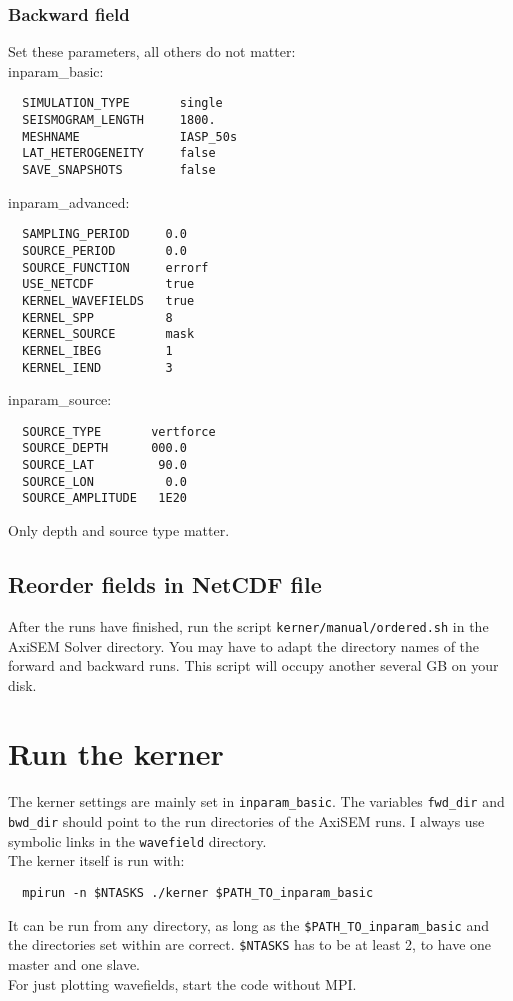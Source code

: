 \documentclass[a4wide]{scrartcl}
\begin{document}
 \subsubsection{Backward field}
 Set these parameters, all others do not matter:  \\
 inparam\_basic:
 \begin{verbatim}
  SIMULATION_TYPE   	single
  SEISMOGRAM_LENGTH  	1800.
  MESHNAME            	IASP_50s
  LAT_HETEROGENEITY   	false
  SAVE_SNAPSHOTS       	false
 \end{verbatim}
 inparam\_advanced:
 \begin{verbatim}
  SAMPLING_PERIOD     0.0
  SOURCE_PERIOD       0.0
  SOURCE_FUNCTION     errorf
  USE_NETCDF          true
  KERNEL_WAVEFIELDS   true
  KERNEL_SPP          8
  KERNEL_SOURCE       mask
  KERNEL_IBEG         1
  KERNEL_IEND         3
 \end{verbatim}
 inparam\_source:
 \begin{verbatim}
  SOURCE_TYPE       vertforce
  SOURCE_DEPTH      000.0
  SOURCE_LAT         90.0
  SOURCE_LON          0.0
  SOURCE_AMPLITUDE   1E20
 \end{verbatim}
 Only depth and source type matter. 
 \subsection{Reorder fields in NetCDF file}
 After the runs have finished, run the script \verb|kerner/manual/ordered.sh| in the AxiSEM Solver directory. You may have to adapt the directory names of the forward and backward runs. This script will occupy another several GB on your disk. 
 
 \section{Run the kerner}
 The kerner settings are mainly set in \verb|inparam_basic|. The variables \verb|fwd_dir| and \verb|bwd_dir| should point to the run directories of the AxiSEM runs. I always use symbolic links in the \verb|wavefield| directory.\\
 The kerner itself is run with:
 \begin{verbatim}
  mpirun -n $NTASKS ./kerner $PATH_TO_inparam_basic
 \end{verbatim}
 It can be run from any directory, as long as the \verb|$PATH_TO_inparam_basic| and the directories set within are correct. \verb|$NTASKS| has to be at least 2, to have one master and one slave.\\
 For just plotting wavefields, start the code without MPI.
 
 
\end{document}
